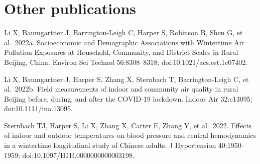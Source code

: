 \documentclass[
  letterpaper,
  DIV=11,
  numbers=noendperiod]{scrartcl}
\begin{document}
\section*{Other publications}\label{other-publications}

Li X, Baumgartner J, Barrington-Leigh C, Harper S, Robinson B, Shen G,
et al.~2022a. Socioeconomic and Demographic Associations with Wintertime
Air Pollution Exposures at Household, Community, and District Scales in
Rural Beijing, China. Environ Sci Technol 56:8308--8318;
doi:10.1021/acs.est.1c07402.

Li X, Baumgartner J, Harper S, Zhang X, Sternbach T, Barrington-Leigh C,
et al.~2022b. Field measurements of indoor and community air quality in
rural Beijing before, during, and after the COVID-19 lockdown. Indoor
Air 32:e13095; doi:10.1111/ina.13095.

Sternbach TJ, Harper S, Li X, Zhang X, Carter E, Zhang Y, et al.~2022.
Effects of indoor and outdoor temperatures on blood pressure and central
hemodynamics in a wintertime longitudinal study of Chinese adults. J
Hypertension 40:1950--1959; doi:10.1097/HJH.0000000000003198.
\end{document}
